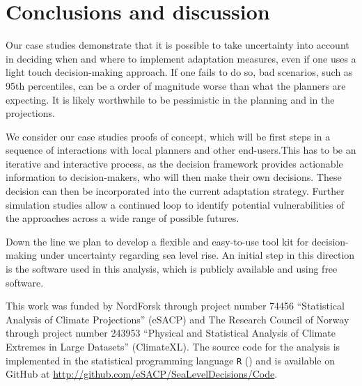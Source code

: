 \documentclass[draft,linenumbers]{agujournal}
\begin{document}

\section{Conclusions and discussion}
\label{disc}
Our case studies demonstrate that it is possible to take uncertainty into account in deciding when and where to implement adaptation measures, even if one uses a light touch decision-making approach. If one fails to do so, bad scenarios, such as 95th percentiles, can be a order of magnitude worse than what the planners are expecting. It is likely worthwhile to be pessimistic in the planning and in the projections. 

We consider our case studies proofs of concept, which will be first steps in a sequence of interactions with local planners and other end-users.This has to be an iterative and interactive process, as the decision framework provides actionable information to decision-makers, who will then make their own decisions. These decision can then be incorporated into the current adaptation strategy. Further simulation studies allow a continued loop to identify potential vulnerabilities of the approaches across a wide range of possible futures.

Down the line we plan to develop a flexible and easy-to-use tool kit for decision-making under uncertainty regarding sea level rise. An initial step in this direction is the software used in this analysis, which is publicly available and using free software. 




\begin{acknowledgments}
This work was funded by NordForsk through project number 74456 ``Statistical Analysis of Climate Projections'' (eSACP) and The Research Council of Norway through project number 243953 ``Physical and Statistical Analysis of Climate Extremes in Large Datasets'' (ClimateXL). The source code for the analysis is implemented in the statistical programming language {\tt R} (\citet{R}) and is available on GitHub at \url{http://github.com/eSACP/SeaLevelDecisions/Code}.
\end{acknowledgments}








\end{document}
